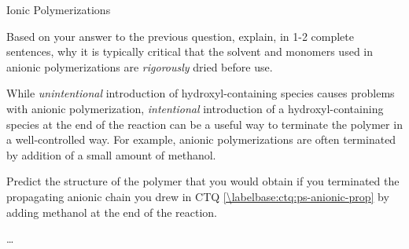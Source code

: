 \begin{activity}{Ionic Polymerizations}
\begin{ctqs}
	\question Based on your answer to the previous question, explain, in 1-2 complete sentences, why it is typically critical that the solvent and monomers used in anionic polymerizations are \emph{rigorously} dried before use.
	
		\begin{solution}[1.25in]
		\end{solution}
	
\end{ctqs}

\begin{infobox}

	While \emph{unintentional} introduction of hydroxyl-containing species causes problems with anionic polymerization, \emph{intentional} introduction of a hydroxyl-containing species at the end of the reaction can be a useful way to terminate the polymer in a well-controlled way.  For example, anionic polymerizations are often terminated by addition of a small amount of methanol.

\end{infobox}

\begin{ctqs}

	\question Predict the structure of the polymer that you would obtain if you terminated the propagating anionic chain you drew in CTQ \ref{\labelbase:ctq:ps-anionic-prop} by adding methanol at the end of the reaction.
	
		\begin{solution}[2in]
		\end{solution}

		
\end{ctqs}


\begin{exercises}

	\exercise \dots
	
\end{exercises}


%
%	


	
\end{activity}